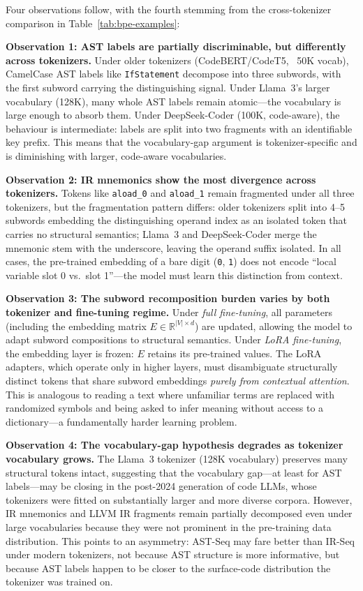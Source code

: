 \documentclass[pdflatex,sn-mathphys,Numbered]{sn-jnl}
\begin{document}
Four observations follow, with the fourth stemming from the cross-tokenizer comparison in Table~\ref{tab:bpe-examples}:

\textbf{Observation 1: AST labels are partially discriminable, but differently across tokenizers.} Under older tokenizers (CodeBERT/CodeT5, ~50K vocab), CamelCase AST labels like \texttt{IfStatement} decompose into three subwords, with the first subword carrying the distinguishing signal. Under Llama~3's larger vocabulary (128K), many whole AST labels remain atomic---the vocabulary is large enough to absorb them. Under DeepSeek-Coder (100K, code-aware), the behaviour is intermediate: labels are split into two fragments with an identifiable key prefix. This means that the vocabulary-gap argument is tokenizer-specific and is diminishing with larger, code-aware vocabularies.

\textbf{Observation 2: IR mnemonics show the most divergence across tokenizers.} Tokens like \texttt{aload\_0} and \texttt{aload\_1} remain fragmented under all three tokenizers, but the fragmentation pattern differs: older tokenizers split into 4--5 subwords embedding the distinguishing operand index as an isolated token that carries no structural semantics; Llama~3 and DeepSeek-Coder merge the mnemonic stem with the underscore, leaving the operand suffix isolated. In all cases, the pre-trained embedding of a bare digit (\texttt{0}, \texttt{1}) does not encode ``local variable slot 0 vs.\ slot 1''---the model must learn this distinction from context.

\textbf{Observation 3: The subword recomposition burden varies by both tokenizer and fine-tuning regime.} Under \emph{full fine-tuning}, all parameters (including the embedding matrix $E \in \mathbb{R}^{|V| \times d}$) are updated, allowing the model to adapt subword compositions to structural semantics. Under \emph{LoRA fine-tuning}, the embedding layer is frozen: $E$ retains its pre-trained values. The LoRA adapters, which operate only in higher layers, must disambiguate structurally distinct tokens that share subword embeddings \emph{purely from contextual attention}. This is analogous to reading a text where unfamiliar terms are replaced with randomized symbols and being asked to infer meaning without access to a dictionary---a fundamentally harder learning problem.

\textbf{Observation 4: The vocabulary-gap hypothesis degrades as tokenizer vocabulary grows.} The Llama~3 tokenizer (128K vocabulary) preserves many structural tokens intact, suggesting that the vocabulary gap---at least for AST labels---may be closing in the post-2024 generation of code LLMs, whose tokenizers were fitted on substantially larger and more diverse corpora. However, IR mnemonics and LLVM IR fragments remain partially decomposed even under large vocabularies because they were not prominent in the pre-training data distribution. This points to an asymmetry: AST-Seq may fare better than IR-Seq under modern tokenizers, not because AST structure is more informative, but because AST labels happen to be closer to the surface-code distribution the tokenizer was trained on.
\end{document}
